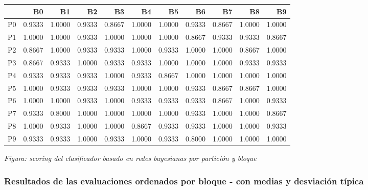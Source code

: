 \documentclass[11pt]{article}
\begin{document}
            \begin{mdframed}[hidealllines=true,backgroundcolor=green!10]
            
    
    \begin{tabular}{lrrrrrrrrrr}
\toprule
{} &      B0 &      B1 &      B2 &      B3 &      B4 &      B5 &      B6 &      B7 &      B8 &      B9 \\
\midrule
P0 &  0.9333 &  1.0000 &  0.9333 &  0.8667 &  1.0000 &  1.0000 &  0.9333 &  0.8667 &  1.0000 &  1.0000 \\
P1 &  1.0000 &  1.0000 &  0.9333 &  1.0000 &  1.0000 &  1.0000 &  0.8667 &  0.9333 &  0.9333 &  0.8667 \\
P2 &  0.8667 &  1.0000 &  0.9333 &  0.9333 &  1.0000 &  0.9333 &  1.0000 &  1.0000 &  0.8667 &  1.0000 \\
P3 &  0.8667 &  0.9333 &  1.0000 &  0.9333 &  0.9333 &  1.0000 &  1.0000 &  1.0000 &  0.9333 &  0.9333 \\
P4 &  0.9333 &  0.9333 &  0.9333 &  1.0000 &  0.9333 &  0.8667 &  1.0000 &  1.0000 &  1.0000 &  1.0000 \\
P5 &  1.0000 &  0.9333 &  0.9333 &  0.9333 &  1.0000 &  1.0000 &  0.9333 &  0.8667 &  0.8667 &  1.0000 \\
P6 &  1.0000 &  1.0000 &  0.9333 &  1.0000 &  0.9333 &  0.9333 &  0.9333 &  0.8667 &  1.0000 &  0.9333 \\
P7 &  0.9333 &  0.8000 &  1.0000 &  1.0000 &  1.0000 &  1.0000 &  0.9333 &  1.0000 &  1.0000 &  0.8667 \\
P8 &  1.0000 &  0.9333 &  1.0000 &  1.0000 &  0.8667 &  0.9333 &  0.9333 &  1.0000 &  1.0000 &  0.9333 \\
P9 &  0.9333 &  0.9333 &  1.0000 &  0.9333 &  1.0000 &  0.9333 &  0.8000 &  1.0000 &  1.0000 &  1.0000 \\
\bottomrule
\end{tabular}

    

            \end{mdframed}
            \endgroup
    \emph{Figura: scoring del clasificador basado en redes bayesianas por
partición y bloque}

\subsubsection{Resultados de las evaluaciones ordenados por bloque - con
medias y desviación
típica}\label{resultados-de-las-evaluaciones-ordenados-por-bloque---con-medias-y-desviaciuxf3n-tuxedpica}
\end{document}
